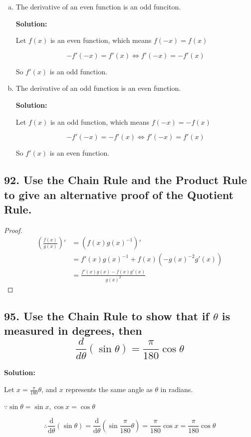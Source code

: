 \documentclass{article}
\newenvironment{solution}{
    \par \textbf{Solution: } \quad \par
}{\par}
\begin{document}
    \begin{enumerate}[(a)]
        \item The derivative of an even function is an odd funciton.
        \begin{solution}
            Let $f(x)$ is an even function, which means $f(-x) = f(x)$

            $$-f'(-x) = f'(x) \iff f'(-x) = -f'(x)$$

            So $f'(x)$ is an odd function.
        \end{solution}
        \item The derivative of an odd function is an even function.

        \begin{solution}
            Let $f(x)$ is an odd function, which means $f(-x) = -f(x)$

            $$-f'(-x) = -f'(x) \iff f'(-x) = f'(x)$$

            So $f'(x)$ is an even function.
        \end{solution}
    \end{enumerate}

    \subsection*{92. Use the Chain Rule and the Product Rule to give an alternative proof of the Quotient Rule.}

    \begin{proof}
        $$\begin{aligned}
            (\frac{f(x)}{g(x)})' &= (f(x)g(x)^{-1})' \\
            &= f'(x)g(x)^{-1} + f(x)(-g(x)^{-2}g'(x)) \\
            &= \frac{f'(x)g(x) - f(x)g'(x)}{g(x)^{2}}
        \end{aligned}$$
    \end{proof}

    \subsection*{95. Use the Chain Rule to show that if $\theta$ is measured in degrees, then $$\frac{d}{d\theta}(\sin \theta) = \frac{\pi}{180}\cos \theta$$}
    
    \begin{solution}
        Let $x = \frac{\pi}{180}\theta$, and $x$ represents the same angle as $\theta$ in radians.

        $\because \sin \theta = \sin x, \cos x = \cos \theta$

        $$\therefore \frac{\mathrm d}{\mathrm d\theta}(\sin \theta) = \frac{\mathrm d}{\mathrm d\theta}(\sin \frac{\pi}{180}\theta) = \frac{\pi}{180} \cos x = \frac{\pi}{180} \cos \theta$$

    \end{solution}
\end{document}
